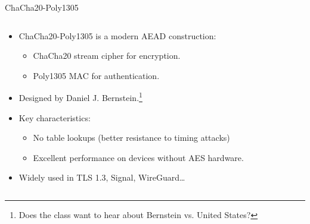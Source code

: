 \documentclass[aspectratio=169, lualatex, handout]{beamer}
\begin{document}
\begin{frame}{ChaCha20-Poly1305}
	\begin{columns}[c]
		\begin{column}{0.6\textwidth}
			\begin{itemize}
				\item ChaCha20-Poly1305 is a modern AEAD construction:
				      \begin{itemize}
					      \item ChaCha20 stream cipher for encryption.
					      \item Poly1305 MAC for authentication.
				      \end{itemize}
				\item Designed by Daniel J. Bernstein.\footnote{Does the class want to hear about Bernstein vs. United States?}
				\item Key characteristics:
				      \begin{itemize}
					      \item No table lookups (better resistance to timing attacks)
					      \item Excellent performance on devices without AES hardware.
				      \end{itemize}
				\item Widely used in TLS 1.3, Signal, WireGuard\ldots
			\end{itemize}
		\end{column}
		\begin{column}{0.4\textwidth}
			\begin{center}
			\end{center}
		\end{column}
	\end{columns}
\end{frame}
\end{document}
